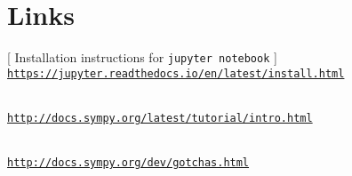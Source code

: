 {	%
	


\section*{Links}

[ Installation instructions for \texttt{jupyter notebook} ] \\ 
\href{https://jupyter.readthedocs.io/en/latest/install.html}
	{\texttt{https://jupyter.readthedocs.io/en/latest/install.html}}

\medskip
{} \\ 
\href{http://docs.sympy.org/latest/tutorial/intro.html}{\texttt{http://docs.sympy.org/latest/tutorial/intro.html}}

\medskip
{} \\ 
\href{http://docs.sympy.org/dev/gotchas.html}{\texttt{http://docs.sympy.org/dev/gotchas.html}}



}



